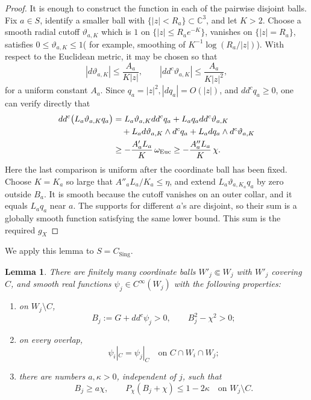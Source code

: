 \documentclass[reqno]{amsart}
\theoremstyle{remark}
\newcommand{\ddc}{dd^c}
\newcommand{\sing}{\text{Sing}}
\theoremstyle{plain}
\newtheorem{lemma}[thm]{Lemma}
\begin{document}
\begin{proof}
It is enough to construct the function in each of the pairwise
disjoint balls.  Fix $a\in S$, identify a smaller ball with
$\{|z|<R_a\}\subset\mathbb C^3$, and let $K>2$.  Choose a smooth radial cutoff $\vartheta_{a,K}$ which is $1$ on $\{|z|\leq R_ae^{-K}\}$, vanishes on $\{|z|=R_a\}$, satisfies $0\leq \vartheta_{a,K}\leq 1$( for example, smoothing of $K^{-1}\log(R_a/|z|)$). With respect to the Euclidean metric, it may be chosen so that \[
|d\vartheta_{a,K}|\leq \frac{A_a}{K|z|}, \qquad |\ddc \vartheta_{a,K}|\leq \frac{A_a}{K|z|^2}, 
\]for a uniform constant $A_a$. Since $q_a=|z|^2, |dq_a|=O(|z|)$, and $\ddc q_a\geq 0$, one can verify directly that \[\begin{aligned}
 \ddc\bigl(L_a\vartheta_{a,K}q_a\bigr)
 &=L_a\vartheta_{a,K}\ddc q_a
   +L_aq_a\ddc\vartheta_{a,K}\\
 &\quad+L_a d\vartheta_{a,K}\wedge d^cq_a
       +L_a dq_a\wedge d^c\vartheta_{a,K}\\
 &\geq-\frac{A'_aL_a}{K}\,\omega_{\rm Euc}
 \geq-\frac{A''_aL_a}{K}\,\chi.
\end{aligned}\]
Here the last comparison is uniform after the coordinate ball has
been fixed.  Choose $K=K_a$ so large that
$A''_aL_a/K_a\leq\eta$, and extend
$L_a\vartheta_{a,K_a}q_a$ by zero outside $B_a$.  It is smooth
because the cutoff vanishes on an outer collar, and it equals
$L_aq_a$ near $a$.  The supports for different $a$'s are
disjoint, so their sum is a globally smooth function satisfying the
same lower bound.  This sum is the required $g_X$
\end{proof}

We apply this lemma to $S=C_{\sing}$. 

\begin{lemma}
\label{lem:compatible-local-branches}
There are finitely many coordinate balls $W'_j\Subset W_j$ with $W'_j$  covering $C$, and smooth
real functions $\psi_j\in C^\infty(W_j)$ with the following
properties:
\begin{enumerate}[label=\textup{(\roman*)}]
\item on $W_j\setminus C$,
      \[
       B_j:=G+\ddc\psi_j>0,\qquad B_j^2-\chi^2>0;
      \]
\item on every overlap,
      \[
       \psi_i|_C=\psi_j|_C
       \quad\text{on }C\cap W_i\cap W_j;
      \]
\item there are numbers $a,\kappa>0$, independent of $j$, such that
      \begin{equation}\label{eq:local-branch-uniform-margins}
       B_j\geq a\chi,\qquad
       P_\chi(B_j+\chi)\leq1-2\kappa
       \quad\text{on }W_j\setminus C.
      \end{equation}
\end{enumerate}
\end{lemma}
\end{document}
